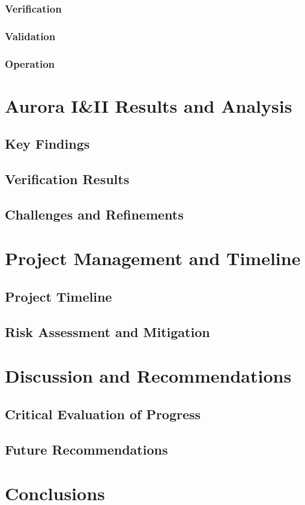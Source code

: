 \subsubsection{Verification}
\subsubsection{Validation}
\subsubsection{Operation}

\section{Aurora I&II Results and Analysis}
\subsection{Key Findings}
\subsection{Verification Results}
\subsection{Challenges and Refinements}

\section{Project Management and Timeline}
\subsection{Project Timeline}
\subsection{Risk Assessment and Mitigation}

\section{Discussion and Recommendations}
\subsection{Critical Evaluation of Progress}
\subsection{Future Recommendations}

\section{Conclusions}

